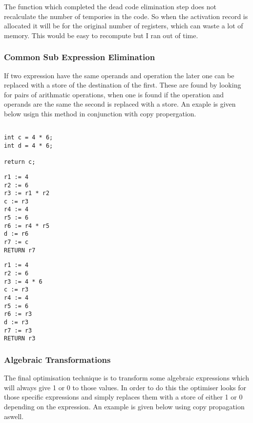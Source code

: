 \documentclass{article}
\begin{document}
The function which completed the dead code elimination step does not recalculate
the number of tempories in the code. So when the activation record is allocated
it will be for the original number of registers, which can waste a lot of memory.
This would be easy to recompute but I ran out of time.

\subsubsection{Common Sub Expression Elimination}
If two expression have the same operands and operation the later one can be replaced
with a store of the destination of the first. These are found by looking for pairs
of arithmatic operations, when one is found if the operation and operands are the
same the second is replaced with a store. An exaple is given below usign this method
in conjunction with copy propergation.

\begin{minipage}{0.3\textwidth}
\begin{lstlisting}

int c = 4 * 6;
int d = 4 * 6;

return c;

\end{lstlisting}
\end{minipage}%
\begin{minipage}{0.3\textwidth}
\begin{lstlisting}
r1 := 4
r2 := 6
r3 := r1 * r2
c := r3
r4 := 4
r5 := 6
r6 := r4 * r5
d := r6
r7 := c
RETURN r7
\end{lstlisting}
\end{minipage}%
\begin{minipage}{0.3\textwidth}
\begin{lstlisting}
r1 := 4
r2 := 6
r3 := 4 * 6
c := r3
r4 := 4
r5 := 6
r6 := r3
d := r3
r7 := r3
RETURN r3
\end{lstlisting}
\end{minipage}%

\subsubsection{Algebraic Transformations}

The final optimisation technique is to transform some algebraic expressions
which will always give 1 or 0 to those values. In order to do this the optimiser
looks for those specific expressions and simply replaces them with a store of either
1 or 0 depending on the expression. An example is given below using copy propagation
aswell.
\end{document}
